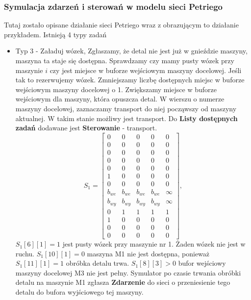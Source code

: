 \documentclass[10pt, a4paper]{article}
\begin{document}
\subsubsection{Symulacja zdarzeń i sterowań w modelu sieci Petriego}
\label{funkcje}

Tutaj zostało opisane działanie sieci Petriego wraz z obrazującym to działanie przykładem.
\newline
Istnieją 4 typy zadań
\begin{itemize}

\item Typ 3 - Załaduj wózek,
Zgłaszamy, że detal nie jest już w gnieździe maszyny, maszyna ta staje się dostępna. Sprawdzamy czy mamy pusty wózek przy maszynie $i$ czy jest miejsce w buforze wejściowym maszyny docelowej. Jeśli tak to rezerwujemy wózek. Zmniejszamy liczbę dostępnych miejsc w buforze wejściowym maszyny docelowej o 1. Zwiększamy miejsce w buforze wejściowym dla maszyny, która opuszcza detal. W wierszu o numerze maszyny docelowej, zaznaczamy transport do niej począwszy od maszyny aktualnej. W takim stanie możliwy jest transport. Do \textbf{Listy dostępnych zadań} dodawane jest \textbf{Sterowanie} - transport.
\begin{equation*}
S_1=\left[\begin{array}{ccccc}
0 & 0 & 0 & 0&0\\
0 & 0 & 0 & 0 & 0\\
0 & 0 & 0 & 0& 0\\
0 & 0 & 0 & 0& 0\\
0 & 0 & 0 & 0& 0\\
1 & 0 & 0 & 0 & 0\\
0 & 0 & 0 & 0& 0\\
b_{we}& b_{we}& b_{we}& b_{we} & \infty\\
b_{wy}& b_{wy}& b_{wy}& b_{wy} & \infty\\
0& 1& 1& 1 & 1\\
1 & 0 & 0 & 0 & 0\\
0 & 0 & 0 & 0 & 0\\
0 & 0 & 0 & 0 & 0
\end{array}\right],
\end{equation*}
$S_1[6][1]=1$ jest pusty wózek przy maszynie nr 1. Żaden wózek nie jest w ruchu. $S_1[10][1]=0$ maszyna M1 nie jest dostępna, ponieważ $S_1[11][1]=1$ obróbka detalu trwa. $S_1[8][3]>0$ bufor wejściowy maszyny docelowej M3 nie jest pełny. Symulator po czasie trwania obróbki detalu na maszynie M1 zgłasza \textbf{Zdarzenie} do sieci o przeniesienie tego detalu do bufora wyjściowego tej maszyny.

\end{itemize}
\end{document}
